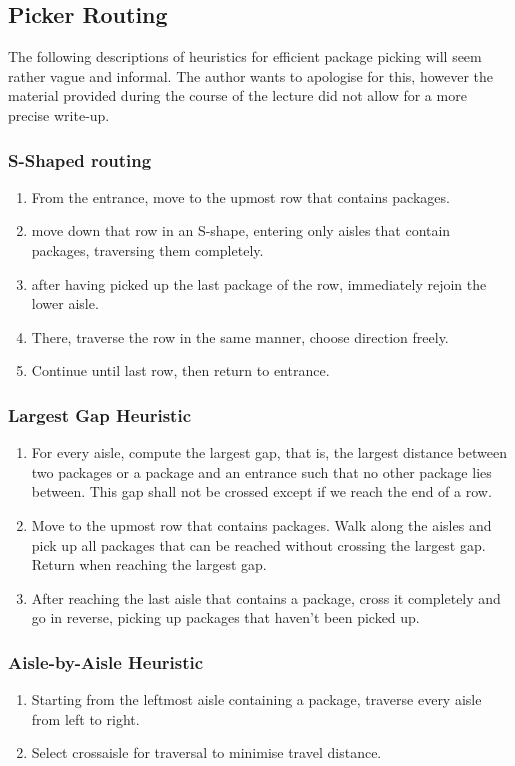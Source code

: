 \documentclass[english]{panikzettel}
\begin{document}
\begin{halfboxl}
    \vspace{-\baselineskip}
    \subsection{Picker Routing}
    The following descriptions of heuristics for efficient package picking will seem rather vague and informal. The author wants to apologise for this, however the material provided during the course of the lecture did not allow for a more precise write-up.
    \subsubsection{S-Shaped routing}
    \begin{enumerate}[nosep,leftmargin=*]
        \item From the entrance, move to the upmost row that contains packages.
        \item move down that row in an S-shape, entering only aisles that contain packages, traversing them completely.
        \item after having picked up the last package of the row, immediately rejoin the lower aisle.
        \item There, traverse the row in the same manner, choose direction freely.
        \item Continue until last row, then return to entrance.
    \end{enumerate}
    \subsubsection{Largest Gap Heuristic}
    \begin{enumerate}[nosep,leftmargin=*]
        \item For every aisle, compute the largest gap, that is, the largest distance between two packages or a package and an entrance such that no other package lies between. This gap shall not be crossed except if we reach the end of a row.
        \item Move to the upmost row that contains packages. Walk along the aisles and pick up all packages that can be reached without crossing the largest gap. Return when reaching the largest gap.
        \item After reaching the last aisle that contains a package, cross it completely and go in reverse, picking up packages that haven't been picked up.
    \end{enumerate}
    \subsubsection{Aisle-by-Aisle Heuristic}
    \begin{enumerate}[nosep,leftmargin=*]
        \item Starting from the leftmost aisle containing a package, traverse every aisle from left to right.
        \item Select crossaisle for traversal to minimise travel distance.
    \end{enumerate}
\end{halfboxl}%
\end{document}
